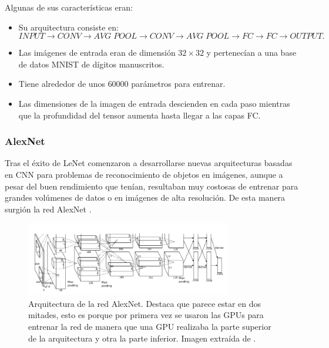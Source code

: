             \noindent Algunas de sus características eran: 

            \begin{itemize}
                \item Su arquitectura consiste en: 
                $$INPUT \rightarrow CONV \rightarrow AVG\;POOL \rightarrow CONV \rightarrow AVG \; POOL \rightarrow FC \rightarrow FC \rightarrow OUTPUT.$$
                \item Las imágenes de entrada eran de dimensión $32 \times 32$ y pertenecían a una base de datos MNIST de dígitos manuscritos.
                \item Tiene alrededor de unos $60000$ parámetros para entrenar.
                \item Las dimensiones de la imagen de entrada descienden en cada paso mientras que la profundidad del tensor aumenta hasta llegar a las capas FC.
            \end{itemize}

        \subsubsection{AlexNet}
            \noindent Tras el éxito de LeNet comenzaron a desarrollarse nuevas arquitecturas basadas en CNN para problemas de reconocimiento de objetos en imágenes, aunque a pesar del buen rendimiento que tenían, resultaban muy costosas de entrenar para grandes volúmenes de datos o en imágenes de alta resolución. De esta manera surgión la red AlexNet \cite{krizhevsky2012imagenet}.

            \begin{figure}[!h]
                \centering
                \includegraphics[width=0.8\textwidth]{img/AlexNet.png}
                \caption{Arquitectura de la red AlexNet. Destaca que parece estar  en dos mitades, esto es porque por primera vez se usaron las GPUs para entrenar la red de manera que una GPU realizaba la parte superior de la arquitectura y otra la parte inferior. Imagen extraída de \cite{krizhevsky2012imagenet}.}
                \label{fig:AlexNet}
            \end{figure}

